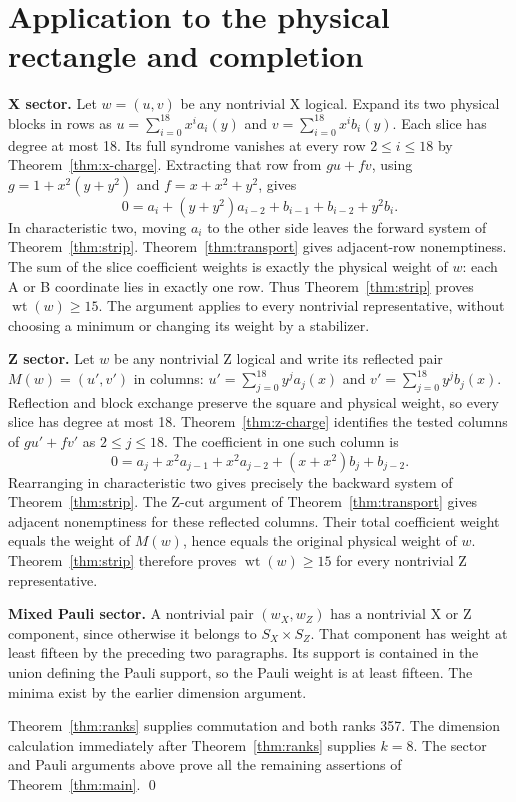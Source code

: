 \documentclass{article}
\DeclareMathOperator{\wt}{wt}
\begin{document}
\section{Application to the physical rectangle and completion}\label{sec:application}

\textbf{X sector.} Let \(w=(u,v)\) be any nontrivial X logical. Expand its two
physical blocks in rows as
\(u=\sum_{i=0}^{18}x^ia_i(y)\) and \(v=\sum_{i=0}^{18}x^ib_i(y)\).
Each slice has degree at most 18. Its full syndrome vanishes at every
row \(2\le i\le 18\) by Theorem~\ref{thm:x-charge}. Extracting that row from
\(gu+fv\), using \(g=1+x^2(y+y^2)\) and \(f=x+x^2+y^2\), gives
\begin{equation}
  0=a_i+(y+y^2)a_{i-2}+b_{i-1}+b_{i-2}+y^2b_i.
\end{equation}
In characteristic two, moving \(a_i\) to the other side leaves the forward
system of Theorem~\ref{thm:strip}. Theorem~\ref{thm:transport} gives
adjacent-row nonemptiness. The sum of
the slice coefficient weights is exactly the physical weight of \(w\):
each A or B coordinate lies in exactly one row. Thus Theorem~\ref{thm:strip}
proves \(\wt(w)\ge 15\). The argument applies to every nontrivial
representative, without choosing a minimum or changing its weight by a
stabilizer.

\textbf{Z sector.} Let \(w\) be any nontrivial Z logical and write its reflected
pair \(M(w)=(u',v')\) in columns:
\(u'=\sum_{j=0}^{18}y^ja_j(x)\) and \(v'=\sum_{j=0}^{18}y^jb_j(x)\).
Reflection and block exchange preserve the square and physical weight,
so every slice has degree at most 18. Theorem~\ref{thm:z-charge} identifies the
tested columns of \(gu'+fv'\) as \(2\le j\le 18\). The coefficient in one such
column is
\begin{equation}
  0=a_j+x^2a_{j-1}+x^2a_{j-2}+(x+x^2)b_j+b_{j-2}.
\end{equation}
Rearranging in characteristic two gives precisely the backward system of
Theorem~\ref{thm:strip}. The Z-cut argument of Theorem~\ref{thm:transport}
gives adjacent nonemptiness for these reflected columns. Their total
coefficient weight equals the weight of \(M(w)\), hence equals the original
physical weight of \(w\). Theorem~\ref{thm:strip} therefore proves
\(\wt(w)\ge 15\) for every nontrivial Z representative.

\textbf{Mixed Pauli sector.} A nontrivial pair \((w_X,w_Z)\) has a nontrivial X
or Z component, since otherwise it belongs to \(S_X\times S_Z\). That component
has weight at least fifteen by the preceding two paragraphs. Its support
is contained in the union defining the Pauli support, so the Pauli weight
is at least fifteen. The minima exist by the earlier dimension argument.

Theorem~\ref{thm:ranks} supplies commutation and both ranks 357. The dimension
calculation immediately after Theorem~\ref{thm:ranks} supplies \(k=8\). The
sector and Pauli arguments above prove all the remaining assertions of
Theorem~\ref{thm:main}. \qed
\end{document}
